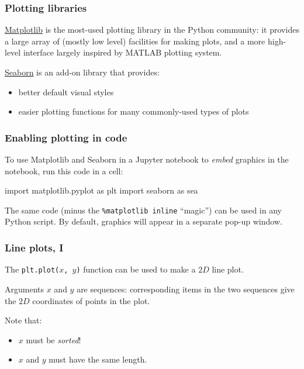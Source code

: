 \documentclass[english,serif,mathserif,xcolor=pdftex,dvipsnames,table]{beamer}
\begin{document}
\begin{frame}
  \frametitle{Plotting libraries}

  \href{http://matplotlib.org/gallery.html}{Matplotlib} is the most-used
plotting library in the Python community: it provides a large array of
(mostly low level) facilities for making plots, and a more high-level
interface largely inspired by MATLAB plotting system.

\href{http://seaborn.pydata.org/index.html}{Seaborn} is an add-on
library that provides:

\begin{itemize}
\item
  better default visual styles
\item
  easier plotting functions for many commonly-used types of plots
\end{itemize}

\end{frame}

\begin{frame}[fragile]
  \frametitle{Enabling plotting in code}

  To use Matplotlib and Seaborn in a Jupyter notebook to \emph{embed} graphics
  in the notebook, run this code in a cell:
  \begin{python}

import matplotlib.pyplot as plt
import seaborn as sea
  \end{python}

  \+ The same code (minus the \texttt{\%matplotlib inline} ``magic'') can be
  used in any Python script.  By default, graphics will appear in a separate
  pop-up window.
\end{frame}


\begin{frame}
  \frametitle{Line plots, I}
  The \texttt{plt.plot($x$, $y$)} function can be used to make a $2D$ line plot.

  \+
  Arguments \texttt{$x$} and \texttt{$y$} are sequences: corresponding items in
  the two sequences give the $2D$ coordinates of points in the plot.

  \+
  Note that:
  \begin{itemize}
  \item \texttt{$x$} must be \emph{sorted}!
  \item \texttt{$x$} and \texttt{$y$} must have the same length.
  \end{itemize}
\end{frame}
\end{document}
